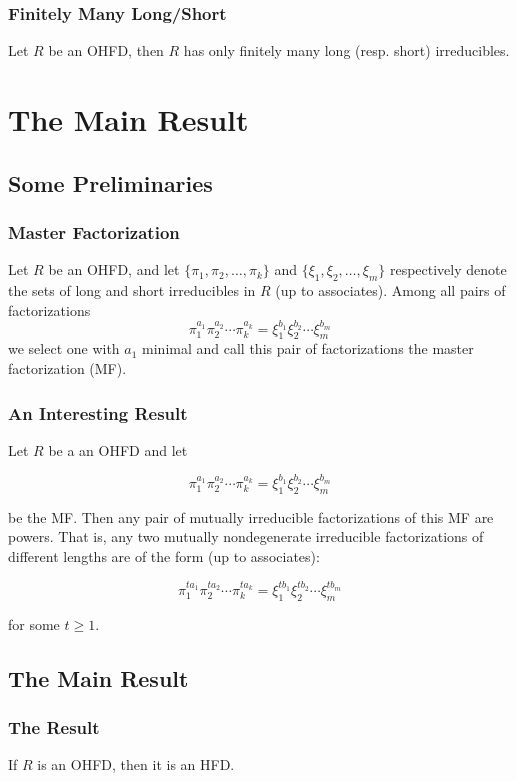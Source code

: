\begin{frame}
  \frametitle{Finitely Many Long/Short}
  \begin{fact}
    Let $R$ be an OHFD, then $R$ has only finitely many long (resp. short) irreducibles.
  \end{fact}
\end{frame}

\section{The Main Result}

\subsection{Some Preliminaries }

\begin{frame}
  \frametitle{Master Factorization }
  \begin{definition}
    Let $R$ be an OHFD, and let $\{\pi_{1},\pi_{2},\ldots,\pi_{k}\}$ and $\{\xi_{1},\xi_{2},\ldots,\xi_{m}\}$ respectively denote the sets of long and short irreducibles in $R$ (up to associates).
    Among all pairs of factorizations
      $$\pi_{1}^{a_{1}}\pi_{2}^{a_{2}}\cdots\pi_{k}^{a_{k}}=  \xi_{1}^{b_{1}}\xi_{2}^{b_{2}}\cdots\xi_{m}^{b_{m}}$$
    we select one with $a_{1}$ minimal and call this pair of factorizations the \alert{master factorization (MF)}.
  \end{definition}
\end{frame}

\begin{frame}
  \frametitle{An Interesting Result }
  \begin{fact}
    Let $R$ be a an OHFD and let

      $$\pi_{1}^{a_{1}}\pi_{2}^{a_{2}}\cdots\pi_{k}^{a_{k}}=  \xi_{1}^{b_{1}}\xi_{2}^{b_{2}}\cdots\xi_{m}^{b_{m}}$$

    be the MF.
    Then any pair of mutually irreducible factorizations of this MF are powers.
    That is, any two mutually nondegenerate irreducible factorizations of different lengths are of the form (up to associates):

      $$\pi_{1}^{ta_{1}}\pi_{2}^{ta_{2}}\cdots\pi_{k}^{ta_{k}}=  \xi_{1}^{tb_{1}}\xi_{2}^{tb_{2}}\cdots\xi_{m}^{tb_{m}}$$

    for some $t\geq1$.
  \end{fact}
\end{frame}

\subsection{The Main Result}
\begin{frame}
  \frametitle{The Result}
  \begin{theorem}
    If $R$ is an OHFD, then it is an HFD.
  \end{theorem}
\end{frame}

